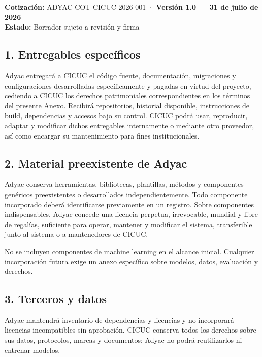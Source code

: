 \documentclass[
]{article}
\begin{document}
\textbf{Cotización:} ADYAC-COT-CICUC-2026-001 · \textbf{Versión 1.0 ---
31 de julio de 2026}\\
\textbf{Estado:} Borrador sujeto a revisión y firma

\hypertarget{1-entregables-especuxedficos}{%
\subsection{1. Entregables
específicos}\label{1-entregables-especuxedficos}}

Adyac entregará a CICUC el código fuente, documentación, migraciones y
configuraciones desarrolladas específicamente y pagadas en virtud del
proyecto, cediendo a CICUC los derechos patrimoniales correspondientes
en los términos del presente Anexo. Recibirá repositorios, historial
disponible, instrucciones de build, dependencias y accesos bajo su
control. CICUC podrá usar, reproducir, adaptar y modificar dichos
entregables internamente o mediante otro proveedor, así como encargar su
mantenimiento para fines institucionales.

\hypertarget{2-material-preexistente-de-adyac}{%
\subsection{2. Material preexistente de
Adyac}\label{2-material-preexistente-de-adyac}}

Adyac conserva herramientas, bibliotecas, plantillas, métodos y
componentes genéricos preexistentes o desarrollados independientemente.
Todo componente incorporado deberá identificarse previamente en un
registro. Sobre componentes indispensables, Adyac concede una licencia
perpetua, irrevocable, mundial y libre de regalías, suficiente para
operar, mantener y modificar el sistema, transferible junto al sistema o
a mantenedores de CICUC.

No se incluyen componentes de machine learning en el alcance inicial.
Cualquier incorporación futura exige un anexo específico sobre modelos,
datos, evaluación y derechos.

\hypertarget{3-terceros-y-datos}{%
\subsection{3. Terceros y datos}\label{3-terceros-y-datos}}

Adyac mantendrá inventario de dependencias y licencias y no incorporará
licencias incompatibles sin aprobación. CICUC conserva todos los
derechos sobre sus datos, protocolos, marcas y documentos; Adyac no
podrá reutilizarlos ni entrenar modelos.
\end{document}
